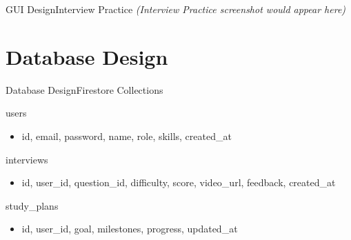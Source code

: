 \documentclass{beamer}
\begin{document}
\begin{frame}{GUI Design}{Interview Practice}
\textit{(Interview Practice screenshot would appear here)}
\end{frame}

\section{Database Design}
\begin{frame}{Database Design}{Firestore Collections}
\begin{block}{users}
\begin{itemize}
    \item id, email, password, name, role, skills, created\_at
\end{itemize}
\end{block}

\begin{block}{interviews}
\begin{itemize}
    \item id, user\_id, question\_id, difficulty, score, video\_url, feedback, created\_at
\end{itemize}
\end{block}

\begin{block}{study\_plans}
\begin{itemize}
    \item id, user\_id, goal, milestones, progress, updated\_at
\end{itemize}
\end{block}
\end{frame}
\end{document}
